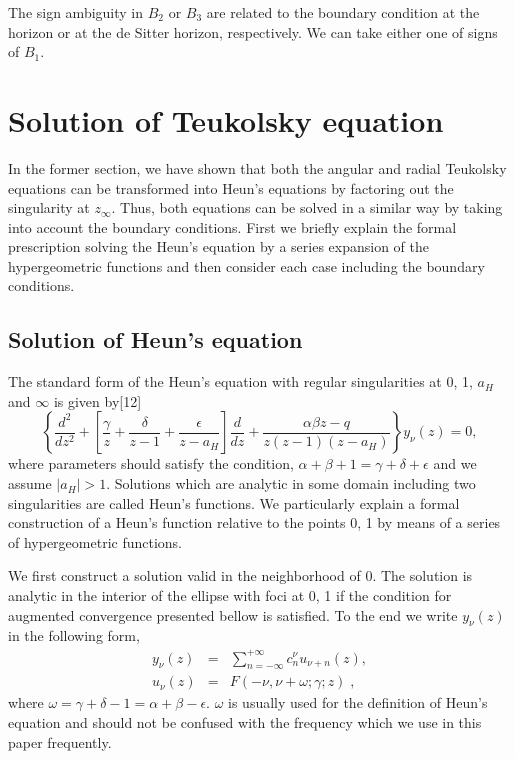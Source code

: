 The sign ambiguity in $B_2$ or $B_3$ are related to the boundary 
condition at the horizon or at the de Sitter horizon, respectively. 
We can take either one of signs of $B_1$. 

\section{Solution of Teukolsky equation}
\setcounter{equation}{0}

In the former section, we have shown that both the angular and radial 
Teukolsky equations can be transformed into Heun's equations 
by factoring out the singularity at $z_\infty$.
Thus, both equations can be solved in a similar way by taking into 
account the boundary conditions.
First we briefly explain the formal prescription solving the Heun's 
equation by a series expansion of the hypergeometric functions  
and then consider each case including the boundary conditions.


\subsection{Solution of Heun's equation} \label{sec:sol}
The standard form of the Heun's equation with regular singularities 
at 0, 1, $a_H$ and $\infty$ is given by[12]
%
\begin{equation}
\left\{ \frac{d^2}{dz^2} + \left[\frac{\gamma}{z} + \frac{\delta}{z-1}
+\frac{\epsilon}{z-a_H} \right] \frac{d}{dz}
+ \frac{\alpha\beta z - q}{z (z-1)(z-a_H)}  \right\} y_\nu(z) =0,
\label{eqn:HE}
\end{equation}
%
where parameters should satisfy the condition, 
$\alpha+\beta+1=\gamma+\delta+\epsilon$ and we assume $|a_H|>1$.  
Solutions which are analytic in some domain including two 
singularities are called Heun's functions. 
We particularly explain a formal construction of a Heun's function 
relative to the points 0, 1 by means of a series of hypergeometric functions. 

We first construct a solution valid in the neighborhood of 0. 
The solution is analytic in the interior of the ellipse with foci 
at 0, 1  
if the condition for augmented convergence presented bellow is satisfied.
To the end we write $y_{\nu}(z)$ in the following form,
%
\begin{eqnarray}
y_{\nu}(z)&=&\sum_{n=-\infty}^{+\infty} c_n^{\nu}u_{\nu+n}(z), 
\label{eqn:ynu}\\
u_{\nu}(z)&=&F(-\nu,\nu+\omega;\gamma;z)\;, \label{eqn:unu}
\end{eqnarray}
%
where $\omega=\gamma+\delta-1=\alpha+\beta-\epsilon$. $\omega$ is 
usually used for the definition of Heun's equation and should not 
be confused with the frequency which we use in this paper 
frequently. 

